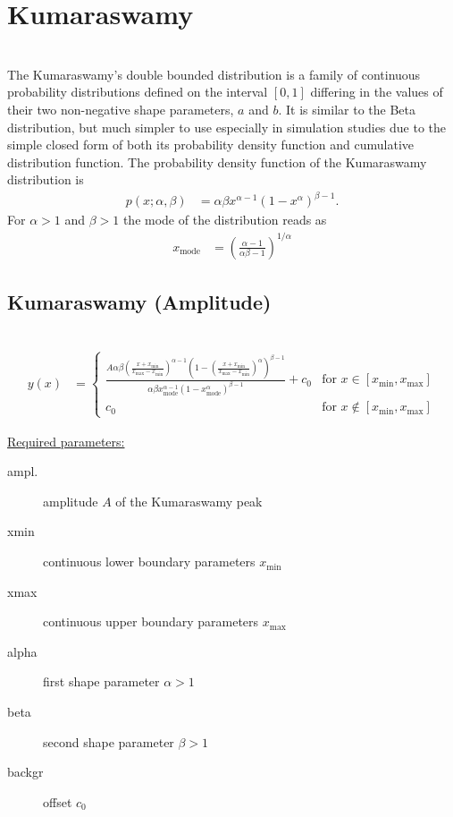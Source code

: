 \clearpage
\section{Kumaraswamy} ~\\
\label{sec:Kumaraswamy}
The Kumaraswamy's double bounded
distribution is a family of continuous probability distributions
defined on the interval $[0,1]$ differing in the values of their two
non-negative shape parameters, $a$ and $b$.
It is similar to the Beta distribution, but much simpler to use
especially in simulation studies due to the simple closed form of
both its probability density function and cumulative distribution
function. The probability density function of the Kumaraswamy distribution is
\begin{align}
p(x; \alpha,\beta) &= \alpha \beta x^{\alpha-1}{ (1-x^\alpha)}^{\beta-1}.
\end{align}
For $\alpha>1$ and $\beta>1$ the mode of the distribution reads as
\begin{align}
x_\text{mode} &= \left(\frac{\alpha-1}{\alpha\beta-1}\right)^{1/\alpha}
\end{align}

\vspace{5mm}
\subsection{Kumaraswamy (Amplitude)} ~\\
\label{sec:KumaraswamyAmplitude}
\begin{align}
y(x) & =
\begin{cases}
\frac{A\alpha \beta \left(\frac{x+x_\text{min}}{x_\text{max}-x_\text{min}}\right)^{\alpha-1}{ \left(1-\left(\frac{x+x_\text{min}}{x_\text{max}-x_\text{min}}\right)^\alpha\right)}^{\beta-1}}{\alpha \beta x_\text{mode}^{\alpha-1}{ (1-x_\text{mode}^\alpha)}^{\beta-1}}
+c_0 & \mbox{for } x \in [x_\text{min},x_\text{max}] \\
c_0 & \mbox{for } x \notin [x_\text{min},x_\text{max}]
\end{cases}
\end{align}

\uline{Required parameters:}
\begin{description}
    \item[ampl.] amplitude $A$ of the Kumaraswamy peak
    \item[xmin] continuous lower boundary parameters $x_\mathrm{min}$
    \item[xmax] continuous upper boundary parameters $x_\mathrm{max}$
    \item[alpha] first shape parameter $\alpha>1$
    \item[beta]  second shape parameter $\beta>1$
    \item[backgr] offset $c_0$
\end{description}

